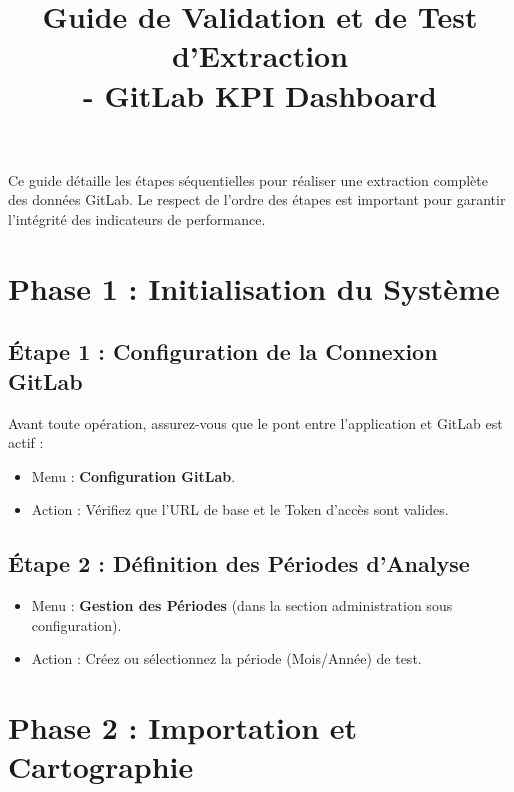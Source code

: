 \documentclass[12pt,a4paper]{article}
\title{Guide de Validation et de Test d'Extraction\\ \large - GitLab KPI Dashboard}
\author{}
\date{} %
\begin{document}
\maketitle

\begin{tcolorbox}[colback=blue!5!white,colframe=blue!75!black,title=Objectif du Document]
Ce guide détaille les étapes séquentielles pour réaliser une extraction complète des données GitLab. Le respect de l'ordre des étapes est important pour garantir l'intégrité des indicateurs de performance.
\end{tcolorbox}

\section{Phase 1 : Initialisation du Système}

\subsection{Étape 1 : Configuration de la Connexion GitLab}
Avant toute opération, assurez-vous que le pont entre l'application et GitLab est actif :
\begin{itemize}[label=\textbullet]
    \item Menu : \textbf{Configuration GitLab}.
    \item Action : Vérifiez que l'URL de base et le Token d'accès sont valides.
\end{itemize}

\subsection{Étape 2 : Définition des Périodes d'Analyse}
\begin{itemize}[label=\textbullet]
    \item Menu : \textbf{Gestion des Périodes} (dans la section administration sous configuration).
    \item Action : Créez ou sélectionnez la période (Mois/Année) de test.
\end{itemize}

\section{Phase 2 : Importation et Cartographie}
\end{document}
